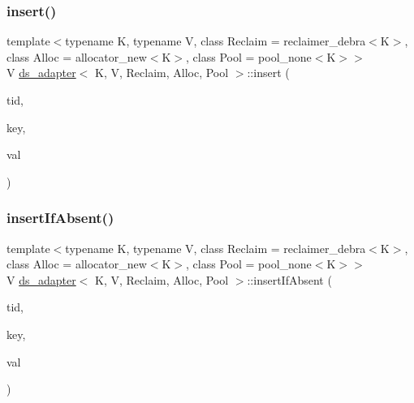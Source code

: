 \subsubsection{\texorpdfstring{insert()}{insert()}\hspace{0.1cm}{\footnotesize\ttfamily [26/26]}}
{\footnotesize\ttfamily template$<$typename K, typename V, class Reclaim = reclaimer\+\_\+debra$<$\+K$>$, class Alloc = allocator\+\_\+new$<$\+K$>$, class Pool = pool\+\_\+none$<$\+K$>$$>$ \\
V \hyperlink{classds__adapter}{ds\+\_\+adapter}$<$ K, V, Reclaim, Alloc, Pool $>$\+::insert (\begin{DoxyParamCaption}\item[{const int}]{tid,  }\item[{const K \&}]{key,  }\item[{const V \&}]{val }\end{DoxyParamCaption})\hspace{0.3cm}{\ttfamily [inline]}}

\mbox{\label{classds__adapter_ae9cb29ad0c0338c0e1d12ef97e008135}} 
\subsubsection{\texorpdfstring{insert\+If\+Absent()}{insertIfAbsent()}\hspace{0.1cm}{\footnotesize\ttfamily [1/26]}}
{\footnotesize\ttfamily template$<$typename K, typename V, class Reclaim = reclaimer\+\_\+debra$<$\+K$>$, class Alloc = allocator\+\_\+new$<$\+K$>$, class Pool = pool\+\_\+none$<$\+K$>$$>$ \\
V \hyperlink{classds__adapter}{ds\+\_\+adapter}$<$ K, V, Reclaim, Alloc, Pool $>$\+::insert\+If\+Absent (\begin{DoxyParamCaption}\item[{const int}]{tid,  }\item[{const K \&}]{key,  }\item[{const V \&}]{val }\end{DoxyParamCaption})\hspace{0.3cm}{\ttfamily [inline]}}

\mbox{\label{classds__adapter_ae9cb29ad0c0338c0e1d12ef97e008135}} 
